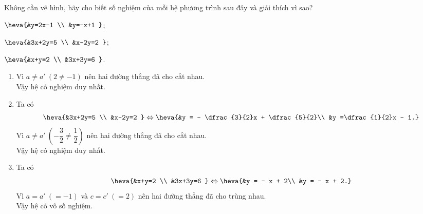 \begin{vd}%
	Không cần vẽ hình, hãy cho biết số nghiệm của mỗi hệ phương trình sau đây và giải thích vì sao?
	\begin{enumEX}{3}
	\item $\heva{&y=2x-1 \\ &y=-x+1 }$;
	\item $\heva{&3x+2y=5 \\ &x-2y=2 }$;
	\item $\heva{&x+y=2 \\ &3x+3y=6 }$.
	\end{enumEX}
	\loigiai
	{
	\begin{enumerate}
	\item Vì $a\ne a'~(2\ne -1)$ nên hai đường thẳng đã cho cắt nhau.\\
	Vậy hệ có nghiệm duy nhất.
	\item Ta có 
	\[\heva{&3x+2y=5 \\ &x-2y=2 }\Leftrightarrow \heva{&y = - \dfrac{3}{2}x + \dfrac{5}{2}\\ &y =\dfrac{1}{2}x - 1.}\]
	Vì $a\ne a'~\left(-\dfrac{3}{2}\ne \dfrac{1}{2}\right)$ nên hai đường thẳng đã cho cắt nhau.\\
	Vậy hệ có nghiệm duy nhất.
	\item Ta có 
	\[\heva{&x+y=2 \\ &3x+3y=6 }\Leftrightarrow \heva{&y = - x + 2\\ &y = - x + 2.}\]
	Vì $a= a'~\left(=-1\right)$ và $c= c'~\left(=2\right)$ nên hai đường thẳng đã cho trùng nhau.\\
	Vậy hệ có vô số nghiệm.
	\end{enumerate}
	}
\end{vd}

